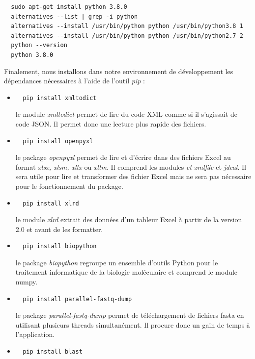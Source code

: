 \documentclass[twoside,a4paper,11pt,frenchb,openany]{report}
\begin{document}
\begin{verbatim}
  sudo apt-get install python 3.8.0
  alternatives --list | grep -i python
  alternatives --install /usr/bin/python python /usr/bin/python3.8 1
  alternatives --install /usr/bin/python python /usr/bin/python2.7 2
  python --version
  python 3.8.0
\end{verbatim}

Finalement, nous installons dans notre environnement de développement les dépendances nécessaires à l'aide de l'outil \textit{pip} :
\begin{itemize}
\item \begin{verbatim}  pip install xmltodict\end{verbatim}
le module \textit{xmltodict} permet de lire du code XML comme si il s'agissait de code JSON. Il permet donc une lecture plus rapide des fichiers.
\item  \begin{verbatim}  pip install openpyxl\end{verbatim}
le package \textit{openpyxl} permet de lire et d'écrire dans des fichiers Excel au format \textit{xlsx, xlsm, xltx} ou \textit{xltm}. Il comprend les modules \textit{et-xmlfile} et \textit{jdcal}. Il sera utile pour lire et transformer des fichier Excel mais ne sera pas nécessaire pour le fonctionnement du package.
\item  \begin{verbatim}  pip install xlrd\end{verbatim}
le module \textit{xlrd} extrait des données d'un tableur Excel à partir de la version 2.0 et avant de les formatter.
\item  \begin{verbatim}  pip install biopython\end{verbatim}
le package \textit{biopython} regroupe un ensemble d'outils Python pour le traitement informatique de la biologie moléculaire et comprend le module numpy.
\item \begin{verbatim}  pip install parallel-fastq-dump\end{verbatim}
le package \textit{parallel-fastq-dump} permet de téléchargement de fichiers fasta en utilisant plusieurs threads simultanément. Il procure donc un gain de temps à l'application.
\item \begin{verbatim}  pip install blast\end{verbatim}
\end{itemize}
\end{document}
